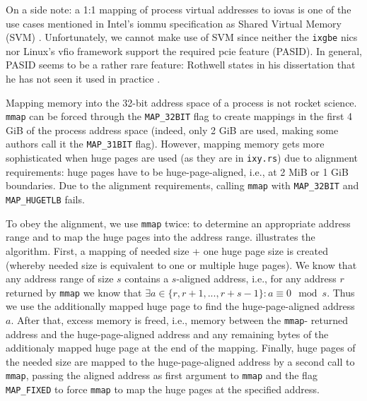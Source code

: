 On a side note: a 1:1 mapping of process virtual addresses to \acp{iova} is one
of the use cases mentioned in Intel's \ac{iommu} specification as Shared Virtual
Memory (SVM) \cite[p.~21]{intel2019iommu}. Unfortunately, we cannot make use of
SVM since neither the \texttt{ixgbe} \acp{nic} nor Linux's \ac{vfio} framework
support the required \ac{pcie} feature (PASID). In general, PASID seems to be a
rather rare feature: Rothwell states in his dissertation that he has not seen it
used in practice \cite[p.~31]{rothwell2018exploitation}.

Mapping memory into the 32-bit address space of a process is not rocket science.
\texttt{mmap} can be forced through the \texttt{MAP\_32BIT} flag to create
mappings in the first 4 GiB of the process address space (indeed, only 2 GiB are
used, making some authors call it the \texttt{MAP\_31BIT} flag). However,
mapping memory gets more sophisticated when huge pages are used (as they are in
\texttt{ixy.rs}) due to alignment requirements: huge pages have to be
huge-page-aligned, i.e., at 2 MiB or 1 GiB boundaries. Due to the alignment
requirements, calling \texttt{mmap} with \texttt{MAP\_32BIT} and
\texttt{MAP\_HUGETLB} fails.

To obey the alignment, we use \texttt{mmap} twice: to determine an appropriate
address range and to map the huge pages into the address range.
 illustrates the algorithm. First, a mapping of needed size
+ one huge page size is created (whereby needed size is equivalent to one or
multiple huge pages). We know that any address range of size $s$ contains a
$s$-aligned address, i.e., for any address $r$ returned by \texttt{mmap} we know
that ${\exists a \in \{r, r + 1, ..., r + s - 1\}: a \equiv 0 \mod s}$. Thus we
use the additionally mapped huge page to find the huge-page-aligned address $a$.
After that, excess memory is freed, i.e., memory between the \texttt{mmap}-
returned address and the huge-page-aligned address and any remaining bytes of
the additionaly mapped huge page at the end of the mapping. Finally, huge pages
of the needed size are mapped to the huge-page-aligned address by a second call
to \texttt{mmap}, passing the aligned address as first argument to \texttt{mmap}
and the flag \texttt{MAP\_FIXED} to force \texttt{mmap} to map the huge pages at
the specified address.

\begin{minipage}{\textwidth}
    
\end{minipage}

